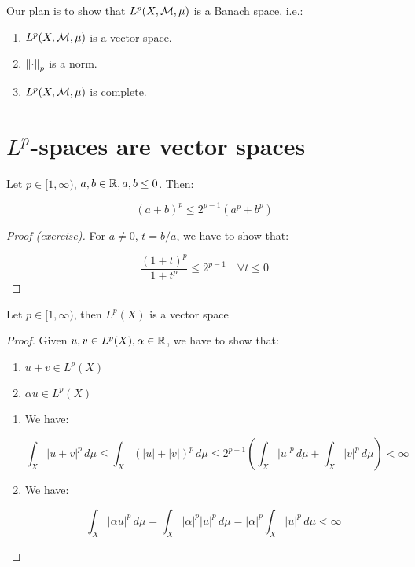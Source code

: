 \begin{note}
    Our plan is to show that $L^p(X, \mathcal{M}, \mu)$ is a Banach space, i.e.:
    \begin{enumerate}
        \item $L^p(X, \mathcal{M}, \mu)$ is a vector space.
        \item $\left\|\cdot\right\|_p$ is a norm.
        \item $L^p(X, \mathcal{M}, \mu)$ is complete.
    \end{enumerate}
\end{note}

\section{$L^p$-spaces are vector spaces}

\begin{flemma}
    Let $p \in [1, \infty)$, $a, b \in \mathbb{R}, a, b \leq 0$. Then:

    $$(a + b)^p \leq 2^{p - 1} (a^p + b^p)$$
\end{flemma}

\begin{proof}[Proof (exercise)]
    For $a \neq 0$, $t = b / a$, we have to show that:

    $$\frac{(1 + t)^p}{1 + t^p} \leq 2^{p - 1} \quad \forall t \leq 0$$
    
\end{proof}

\begin{ftheorem}
    Let $p \in [1, \infty)$, then $L^p(X)$ is a vector space
\end{ftheorem}

\begin{proof}
    Given $u, v \in L^p(X), \alpha \in \mathbb{R}$, we have to show that:

    \begin{enumerate}
        \item $u + v \in L^p(X)$
        \item $\alpha u \in L^p(X)$
    \end{enumerate}

    \begin{enumerate}
        \item We have:

        $$\int_X |u + v|^p \, d\mu \leq \int_X (|u| + |v|)^p \, d\mu \leq 2^{p - 1} \left( \int_X |u|^p \, d\mu + \int_X |v|^p \, d\mu \right) < \infty$$

        \item We have:

        $$\int_X |\alpha u|^p \, d\mu = \int_X |\alpha|^p |u|^p \, d\mu = |\alpha|^p \int_X |u|^p \, d\mu < \infty$$

    \end{enumerate}
\end{proof}

